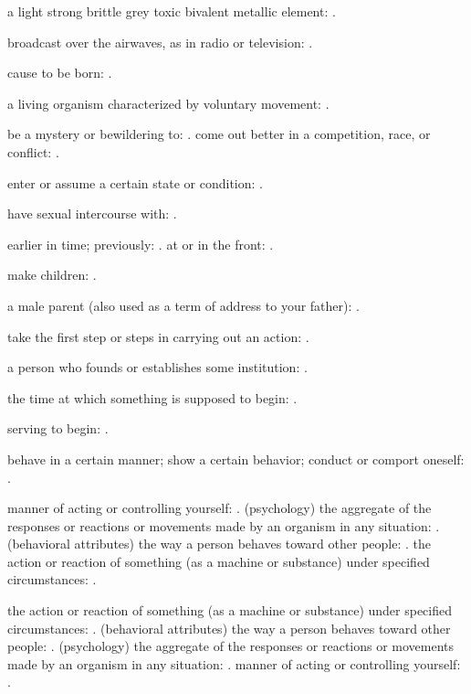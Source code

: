   a light strong brittle grey toxic bivalent metallic element: .

  broadcast over the airwaves, as in radio or television: .

  cause to be born: .

  a living organism characterized by voluntary movement: .

  be a mystery or bewildering to: . come out better in a competition, race, or conflict: .

  enter or assume a certain state or condition: .

  have sexual intercourse with: .

  earlier in time; previously: . at or in the front: .

  make children: .

  a male parent (also used as a term of address to your father): .

  take the first step or steps in carrying out an action: .

  a person who founds or establishes some institution: .

  the time at which something is supposed to begin: .

  serving to begin: .

  behave in a certain manner; show a certain behavior; conduct or comport oneself: .

  manner of acting or controlling yourself: . (psychology) the aggregate of the responses or reactions or movements made by an organism in any situation: . (behavioral attributes) the way a person behaves toward other people: . the action or reaction of something (as a machine or substance) under specified circumstances: .

  the action or reaction of something (as a machine or substance) under specified circumstances: . (behavioral attributes) the way a person behaves toward other people: . (psychology) the aggregate of the responses or reactions or movements made by an organism in any situation: . manner of acting or controlling yourself: .


